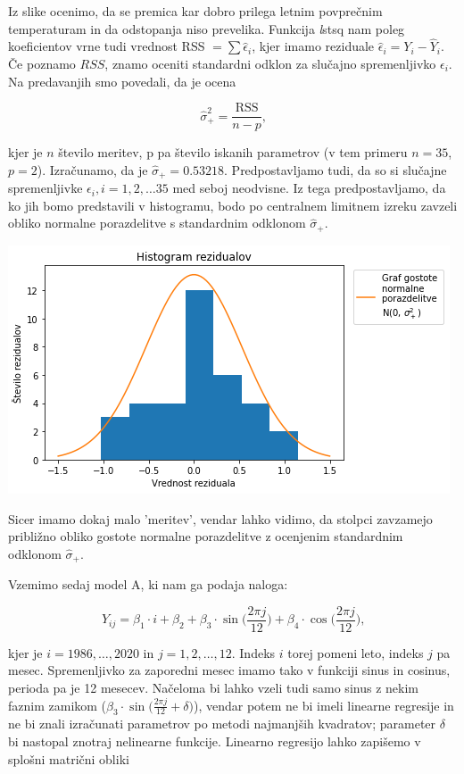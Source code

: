 \documentclass[12pt, a4paper]{article}
\begin{document}
Iz slike ocenimo, da se premica kar dobro prilega letnim povprečnim temperaturam 
in da odstopanja niso prevelika. Funkcija \emph lstsq nam poleg koeficientov vrne
tudi vrednost RSS $= \sum \hat{\epsilon}_i$, kjer imamo reziduale $\hat{\epsilon}_i
 = Y_i - \hat{Y}_i$. Če poznamo $RSS$, znamo oceniti standardni odklon za slučajno
 spremenljivko $\epsilon_i$. Na predavanjih smo povedali, da je ocena 
 
$$ \hat{\sigma}^2_+ = \frac{\text{RSS}}{n-p} \text{,}
$$

kjer je $n$ število meritev, p pa število iskanih parametrov (v tem primeru $n = 35$,
$p=2$). Izračunamo, da je $\hat{\sigma}_+ = 0.53218$. Predpostavljamo tudi, da so si
slučajne spremenljivke $\epsilon_i, i = 1, 2, \dots 35$ med seboj neodvisne. Iz tega 
predpostavljamo, da ko jih bomo predstavili v histogramu, bodo po centralnem limitnem 
izreku zavzeli obliko normalne porazdelitve s standardnim odklonom $\hat{\sigma}_+$.

\begin{center}
    \includegraphics[scale=0.7]{Naloga_3_04}
\end{center}

Sicer imamo dokaj malo 'meritev', vendar lahko vidimo, da stolpci zavzamejo približno 
obliko gostote normalne porazdelitve z ocenjenim standardnim odklonom $\hat{\sigma}_+$.

Vzemimo sedaj model A, ki nam ga podaja naloga:

\[
    Y_{ij} = \beta_1 \cdot i + \beta_2 + \beta_3 \cdot \sin \Big(\frac{2\pi j}{12}\Big) 
    + \beta_4 \cdot \cos \Big(\frac{2\pi j}{12}\Big) \text{,}
\]

kjer je $i=1986,\dots,2020$ in $j=1,2,\dots,12$. Indeks $i$ torej pomeni leto, indeks 
$j$ pa mesec. Spremenljivko za zaporedni mesec imamo tako v funkciji sinus in cosinus, 
perioda pa je 12 mesecev. 
Načeloma bi lahko vzeli tudi samo sinus z nekim faznim zamikom ($\beta_3 \cdot\sin 
\big(\frac{2\pi j}{12} + \delta \big)$), vendar potem 
ne bi imeli linearne regresije in ne bi znali izračunati parametrov po metodi najmanjših 
kvadratov; parameter $\delta$ bi nastopal znotraj nelinearne funkcije.
Linearno regresijo lahko zapišemo v splošni matrični obliki
\end{document}
